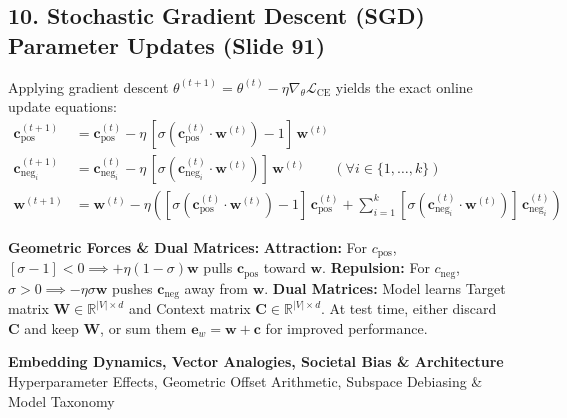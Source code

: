 \documentclass[10pt,a4paper]{article}
\begin{document}
\vspace{-2pt}
\subsection*{\color{themeblue} 10. Stochastic Gradient Descent (SGD) Parameter Updates (Slide 91)}
\vspace{-2pt}

\begin{theoremprompt}[title={\textbf{Parameter Update Rules with Learning Rate $\eta$}}]
\footnotesize
Applying gradient descent $\theta^{(t+1)} = \theta^{(t)} - \eta \nabla_\theta \mathcal{L}_{\text{CE}}$ yields the exact online update equations:
\begin{align}
    \mathbf{c}_{\text{pos}}^{(t+1)}   &= \mathbf{c}_{\text{pos}}^{(t)} - \eta \, [\sigma(\mathbf{c}_{\text{pos}}^{(t)} \cdot \mathbf{w}^{(t)}) - 1]\,\mathbf{w}^{(t)} \\
    \mathbf{c}_{\text{neg}_i}^{(t+1)} &= \mathbf{c}_{\text{neg}_i}^{(t)} - \eta \, [\sigma(\mathbf{c}_{\text{neg}_i}^{(t)} \cdot \mathbf{w}^{(t)})]\,\mathbf{w}^{(t)} \qquad (\forall i \in \{1, \dots, k\}) \\
    \mathbf{w}^{(t+1)}                &= \mathbf{w}^{(t)} - \eta \left( [\sigma(\mathbf{c}_{\text{pos}}^{(t)} \cdot \mathbf{w}^{(t)}) - 1]\,\mathbf{c}_{\text{pos}}^{(t)} + \sum_{i=1}^k [\sigma(\mathbf{c}_{\text{neg}_i}^{(t)} \cdot \mathbf{w}^{(t)})]\,\mathbf{c}_{\text{neg}_i}^{(t)} \right)
\end{align}
\end{theoremprompt}

\vspace{-2pt}
\begin{insightbox}
\footnotesize
\textbf{Geometric Forces \& Dual Matrices:}
\textbf{Attraction:} For $c_{\text{pos}}$, $[\sigma - 1] < 0 \implies +\eta(1 - \sigma)\mathbf{w}$ pulls $\mathbf{c}_{\text{pos}}$ toward $\mathbf{w}$.
\textbf{Repulsion:} For $c_{\text{neg}}$, $\sigma > 0 \implies -\eta \sigma \mathbf{w}$ pushes $\mathbf{c}_{\text{neg}}$ away from $\mathbf{w}$.
\textbf{Dual Matrices:} Model learns Target matrix $\mathbf{W} \in \mathbb{R}^{|V| \times d}$ and Context matrix $\mathbf{C} \in \mathbb{R}^{|V| \times d}$. At test time, either discard $\mathbf{C}$ and keep $\mathbf{W}$, or sum them $\mathbf{e}_w = \mathbf{w} + \mathbf{c}$ for improved performance.
\end{insightbox}

\clearpage

\begin{center}
    \vspace{-4pt}
    {\Large\bfseries\color{themeblue} Embedding Dynamics, Vector Analogies, Societal Bias \& Architecture}\\[1pt]
    {\small\color{darkgray} Hyperparameter Effects, Geometric Offset Arithmetic, Subspace Debiasing \& Model Taxonomy}
    \vspace{-4pt}
\end{center}
\end{document}

